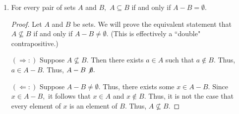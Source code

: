 \documentclass[12pt]{article}
\begin{document}
\begin{enumerate}
\vfill

\item For every pair of sets $A$ and $B,$  $A \subseteq B$ if and only if $A-B = \emptyset.$ 

\begin{proof} Let $A$ and $B$ be sets. We will prove the equivalent statement that $A \not \subseteq B$ if and only if $A-B \not = \emptyset.$ (This is effectively a ``double" contrapositive.)


$( \Rightarrow :)$ Suppose $A \not \subseteq B.$ Then there exists $a \in A$ such that $a \not \in B.$ Thus, $a \in A-B.$ Thus, $A-B \not \emptyset.$

$( \Leftarrow :)$ Suppose $A-B \not= \emptyset.$ Thus, there exists some $x \in A-B.$ Since $x \in A-B,$ it follows that $x \in A$ and $x \not \in B.$ Thus, it is not the case that every element of $x$ is an element of $B.$ Thus, $A \not \subseteq B.$

\end{proof}

\end{enumerate}
\end{document}
